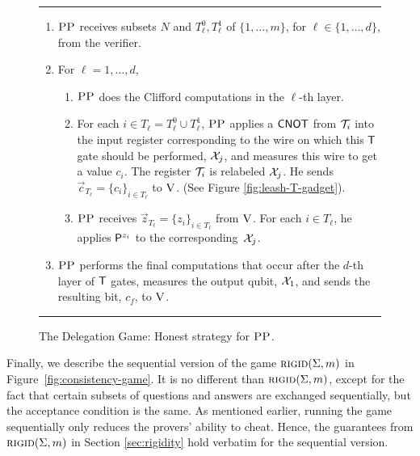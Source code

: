 \documentclass[11pt]{article}
\theoremstyle{remark}
\theoremstyle{definition}
\newcommand{\rigid}{\textsc{rigid}}
\newcommand{\ver}{\textsc{V}}
\newcommand{\pp}{\textsc{PP}}
\begin{document}
\begin{figure}[H]
\rule[1ex]{16.5cm}{0.5pt}
\begin{enumerate}
\item $\pp$ receives subsets $N$ and $T_\ell^0,T_\ell^1$ of $\{1,\ldots,m\}$, for $\ell\in\{1,\ldots,d\}$, from the verifier. 
\item For $\ell=1,\dots,d$, 
\begin{enumerate}
\item $\pp$ does the Clifford computations in the $\ell$-th layer.
 \item For each $i\in T_\ell = T_\ell^0\cup T_\ell^1$, $\pp$ applies a $\sf CNOT$ from ${\cal T}_i$ into the input register corresponding to the wire on which this $\sf T$ gate should be performed, ${\cal X}_{j}$, and measures this wire to get a value $c_i$. The register ${\cal T}_i$ is relabeled ${\cal X}_{j}$. He sends $\vec{c}_{T_\ell} = \{c_i\}_{i\in T_{\ell}}$ to $\ver$. (See Figure \ref{fig:leash-T-gadget}).
\item $\pp$ receives $\vec{z}_{T_{\ell}}=\{z_i\}_{i\in T_\ell}$ from $\ver$. For each $i\in T_\ell$, he applies ${\sf P}^{z_i}$ to the corresponding~${\cal X}_{j}$. 
\end{enumerate} 
\item $\pp$ performs the final computations that occur after the $d$-th layer of $\sf T$ gates, measures the output qubit, ${\cal X}_1$, and sends the resulting bit, $c_f$, to $\ver$. 
\end{enumerate}
\rule[2ex]{16.5cm}{0.5pt}\vspace{-.5cm}
\caption{The Delegation Game: Honest strategy for $\pp$.}\label{fig:leash-protocol-PP}
\end{figure}

Finally, we describe the sequential version of the game $\rigid(\Sigma,m)$ in Figure~\ref{fig:consistency-game}. It is no different than $\rigid(\Sigma,m)$, except for the fact that certain subsets of questions and answers are exchanged sequentially, but the acceptance condition is the same. As mentioned earlier, running the game sequentially only reduces the provers' ability to cheat. Hence, the guarantees from $\rigid(\Sigma,m)$ in Section \ref{sec:rigidity} hold verbatim for the sequential version. 
\end{document}
